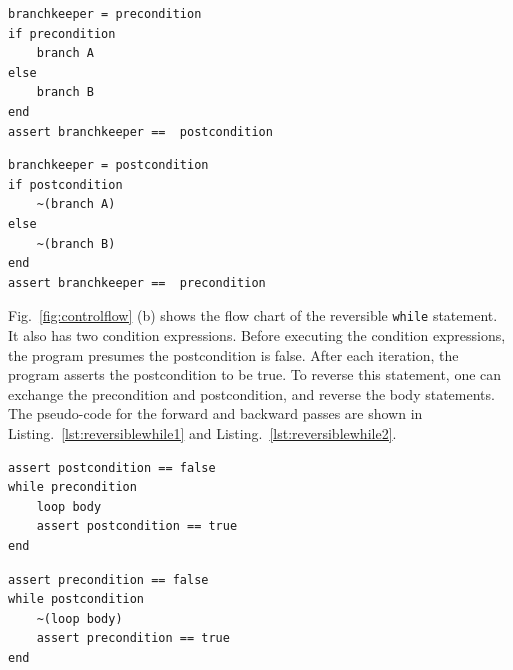 \documentclass{article}
\newcommand{\<}{\langle}
\renewcommand{\>}{\rangle}
\newcommand{\Fig}[1]{Fig.~\ref{#1}}
\newcommand{\Lst}[1]{Listing.~\ref{#1}}
\theoremstyle{definition}\newtheorem{definition}{\textit{Definition}}
\begin{document}
\begin{minipage}{.45\columnwidth}
\begin{lstlisting}[mathescape=true,caption={Translating a reversible \texttt{if} statement (forward)},label={lst:reversibleif1}]
branchkeeper = precondition
if precondition
    branch A
else
    branch B
end
assert branchkeeper ==  postcondition
\end{lstlisting}
\end{minipage}
\hfill
\begin{minipage}{.45\columnwidth}
\begin{lstlisting}[mathescape=true,caption={Translating a reversible \texttt{if} statement (backward)},label={lst:reversibleif2}]
branchkeeper = postcondition
if postcondition
    ~(branch A)
else
    ~(branch B)
end
assert branchkeeper ==  precondition
\end{lstlisting}
\end{minipage}

\Fig{fig:controlflow} (b) shows the flow chart of the reversible \texttt{while} statement. It also has two condition expressions. Before executing the condition expressions, the program presumes the postcondition is false.
After each iteration, the program asserts the postcondition to be true. To reverse this statement, one can exchange the precondition and postcondition, and reverse the body statements. The pseudo-code for the forward and backward passes are shown in \Lst{lst:reversiblewhile1} and \Lst{lst:reversiblewhile2}.

\begin{minipage}{.45\columnwidth}
\begin{lstlisting}[mathescape=true,caption={Translating a reversible \texttt{while} statement (forward)},label={lst:reversiblewhile1}]
assert postcondition == false
while precondition
    loop body
    assert postcondition == true
end
\end{lstlisting}
\end{minipage}
\hfill
\begin{minipage}{.45\columnwidth}
\begin{lstlisting}[mathescape=true,caption={Translating a reversible \texttt{while} statement (backward)},label={lst:reversiblewhile2}]
assert precondition == false
while postcondition
    ~(loop body)
    assert precondition == true
end
\end{lstlisting}
\end{minipage}
\end{document}
